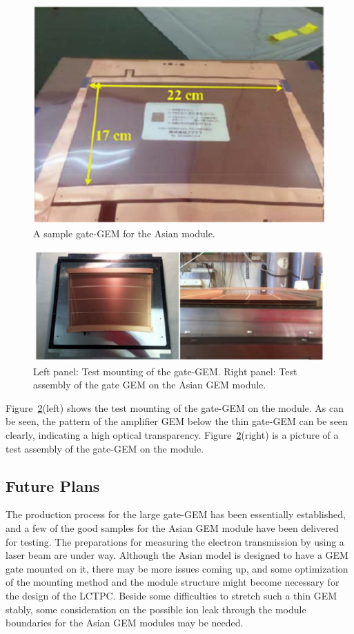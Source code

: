 \begin{figure}
\begin{center}
\includegraphics[width=.7\textwidth]{Tracker/TPC_Bonn/plots/TPC-Gate_Fig6gating.pdf}%
\caption{\label{Fig6gating} {A sample gate-GEM for the Asian module.}}
\end{center}
\end{figure}

\begin{figure}
\begin{center}
\includegraphics[width=.7\textwidth]{Tracker/TPC_Bonn/plots/TPC-Gate_Fig78gating.pdf}%
\caption{\label{Fig78gating} {Left panel: Test mounting of the gate-GEM. Right panel: Test assembly of the gate GEM on the Asian GEM module.}}
\end{center}
\end{figure}

Figure~\ref{Fig78gating}(left) shows the test mounting of the gate-GEM on the module. As can be seen,
the pattern of the amplifier GEM below the thin gate-GEM can be seen clearly, indicating a  high optical transparency.
Figure~\ref{Fig78gating}(right) is a picture of a test assembly of the gate-GEM on the module.

\subsection{Future Plans}

The production process for the large gate-GEM has been essentially established,
and a few of the good samples for the Asian GEM module have been delivered for testing.
The preparations for measuring the electron transmission by using a laser beam are under way.
Although the Asian model is designed to have a GEM gate mounted on it,
there may be more issues coming up, and some optimization of the mounting method and the module structure
might become necessary for the design of the LCTPC. Beside some difficulties to stretch such a thin
GEM stably, some consideration on the possible ion leak through the module boundaries
for the Asian GEM modules may be needed.
